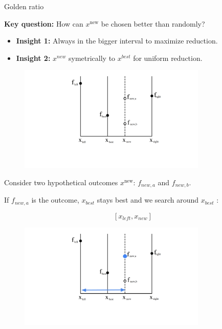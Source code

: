 \documentclass[11pt,compress,t,notes=noshow, xcolor=table]{beamer}
\begin{document}
\begin{vbframe}{Golden ratio}

\textbf{Key question:} How can $x^{\text{new}}$ be chosen better than randomly? 

\begin{itemize}
    \item \textbf{Insight 1: } Always in the bigger interval to maximize reduction.
    \item \textbf{Insight 2: } $x^{new}$ symetrically to $x^{best}$ for uniform reduction. 
\end{itemize}

\begin{figure}
\includegraphics[width=0.8\textwidth]{figure_man/goldensec-0.png}
\end{figure}

\vspace*{-0.5cm}

Consider two hypothetical outcomes $x^{\text{new}}$: $f_{new, a}$ and $f_{new, b}$. 

\framebreak

If $f_{new, a}$ is the outcome, $x_{best}$ stays best and we search around $x_{best}$ : 

$$
    [x_{left}, x_{new}]
$$

\begin{figure}
\includegraphics[width=0.8\textwidth]{figure_man/goldensec-1.png}\\
\end{figure}


\end{vbframe}
\end{document}
